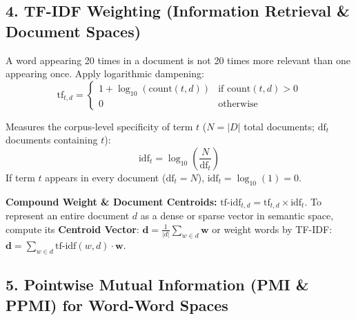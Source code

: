 \documentclass[10pt,a4paper]{article}
\begin{document}
\vspace{-3pt}
\subsection*{\color{themeblue} 4. TF-IDF Weighting (Information Retrieval \& Document Spaces)}
\vspace{-2pt}

\noindent\begin{minipage}[t]{0.485\textwidth}
\begin{theoremprompt}[title={\textbf{Sub-linear Term Frequency ($\text{tf}_{t,d}$)}}]
\footnotesize
A word appearing 20 times in a document is not 20 times more relevant than one appearing once. Apply logarithmic dampening:
\begin{equation}
    \text{tf}_{t,d} = \begin{cases} 1 + \log_{10}(\text{count}(t, d)) & \text{if } \text{count}(t, d) > 0 \\ 0 & \text{otherwise} \end{cases}
\end{equation}
\end{theoremprompt}
\end{minipage}\hfill
\begin{minipage}[t]{0.485\textwidth}
\begin{theoremprompt}[title={\textbf{Inverse Document Frequency ($\text{idf}_t$)}}]
\footnotesize
Measures the corpus-level specificity of term $t$ ($N = |D|$ total documents; $\text{df}_t$ documents containing $t$):
\begin{equation}
    \text{idf}_t = \log_{10}\left(\frac{N}{\text{df}_t}\right)
\end{equation}
If term $t$ appears in every document ($\text{df}_t = N$), $\text{idf}_t = \log_{10}(1) = 0$.
\end{theoremprompt}
\end{minipage}

\vspace{1pt}
\noindent\textbf{Compound Weight \& Document Centroids:} $\text{tf-idf}_{t,d} = \text{tf}_{t,d} \times \text{idf}_t$. To represent an entire document $d$ as a dense or sparse vector in semantic space, compute its \textbf{Centroid Vector}: $\mathbf{d} = \frac{1}{|d|}\sum_{w \in d} \mathbf{w}$ or weight words by TF-IDF: $\mathbf{d} = \sum_{w \in d} \text{tf-idf}(w, d) \cdot \mathbf{w}$.

\vspace{1pt}
\subsection*{\color{themeblue} 5. Pointwise Mutual Information (PMI \& PPMI) for Word-Word Spaces}
\vspace{-2pt}
\end{document}
